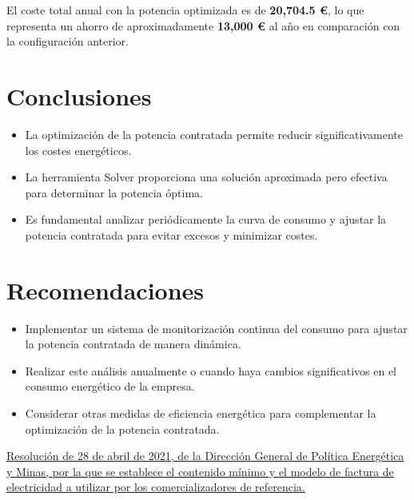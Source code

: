 \documentclass[a4paper,10pt,twocolumn]{article}
\begin{document}
\begin{Form}
El coste total anual con la potencia optimizada es de \textbf{20,704.5 €}, lo que representa un ahorro de aproximadamente \textbf{13,000 €} al año en comparación con la configuración anterior.

\section{Conclusiones}
\begin{itemize}
    \item La optimización de la potencia contratada permite reducir significativamente los costes energéticos.
    \item La herramienta Solver proporciona una solución aproximada pero efectiva para determinar la potencia óptima.
    \item Es fundamental analizar periódicamente la curva de consumo y ajustar la potencia contratada para evitar excesos y minimizar costes.
\end{itemize}

\section{Recomendaciones}
\begin{itemize}
    \item Implementar un sistema de monitorización continua del consumo para ajustar la potencia contratada de manera dinámica.
    \item Realizar este análisis anualmente o cuando haya cambios significativos en el consumo energético de la empresa.
    \item Considerar otras medidas de eficiencia energética para complementar la optimización de la potencia contratada.
\end{itemize}
















\begin{thebibliography}{99}
     \href{https://www.boe.es/buscar/pdf/2021/BOE-A-2021-7120-consolidado.pdf}{Resolución de 28 de abril de 2021, de la Dirección General de Política Energética y Minas, por la que se establece el contenido
mínimo y el modelo de factura de electricidad a utilizar por los comercializadores de referencia.}



\end{thebibliography}
\end{Form}
\end{document}

